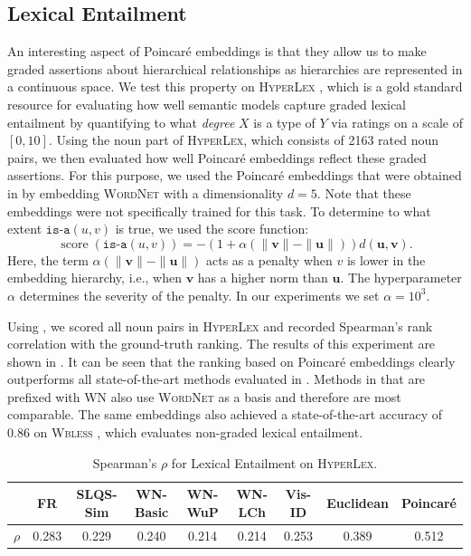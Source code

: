 \documentclass[11pt]{article}
\renewcommand{\vec}[1]{\bm{#1}}
\newcommand{\vu}{\vec{u}}
\newcommand{\vv}{\vec{v}}
\newcommand{\method}[1]{\textsc{#1}\xspace}
\newcommand{\score}{\operatorname{score}}
\begin{document}
\subsection{Lexical Entailment}
\label{sec:org29598e6}
An interesting aspect of Poincaré embeddings is that they allow us to make
graded assertions about hierarchical relationships as hierarchies are
represented in a continuous space. We test this property on \method{HyperLex}
\cite{vulic2016hyperlex}, which is a gold standard resource for evaluating how
well semantic models capture graded lexical entailment by quantifying to what \emph{degree} \(X\) is a type of \(Y\) via
ratings on a scale of \([0,10]\). Using the noun part of \method{HyperLex}, which
consists of 2163 rated noun pairs, we then evaluated how well Poincaré
embeddings reflect these graded assertions. For this purpose, we used the
Poincaré embeddings that were obtained in  by embedding
\method{WordNet} with a dimensionality \(d=5\). Note that these embeddings were
not specifically trained for this task. To determine to what
extent \(\texttt{is-a}(u, v)\) is true, we used the score function:
\begin{equation}
\score(\texttt{is-a}(u,v)) = -(1 + \alpha (\|\vv\| - \|\vu\|)) d(\vu, \vv) \label{eq:hyperlex-score} .
\end{equation}
Here, the term \(\alpha(\|\vv\| - \|\vu\|)\) acts as a penalty
when \(v\) is lower in the embedding hierarchy, i.e., when \(\vv\) has a higher norm
than \(\vu\). The hyperparameter \(\alpha\) determines the severity of the penalty. In
our experiments we set \(\alpha = 10^3\).

Using , we scored all noun pairs in \method{HyperLex}
and recorded Spearman's rank correlation with the ground-truth ranking. The
results of this experiment are shown in .
It can be seen that the ranking based on Poincaré embeddings clearly outperforms
all state-of-the-art methods evaluated in \cite{vulic2016hyperlex}. Methods in
 that are prefixed with WN also use \method{WordNet}
as a basis and therefore are most comparable. The same embeddings also achieved
a state-of-the-art accuracy of \(0.86\) on \method{Wbless}
\cite{weeds2014learning,kiela2015exploiting}, which evaluates non-graded lexical
entailment.

\begin{table}[t]\small
\caption{\label{tab:hyperlex-spearman}
Spearman's \(\rho\) for Lexical Entailment on \method{HyperLex}.}
\centering
\begin{tabular}{lcccccccc}
\toprule
 & \textbf{FR} & \textbf{SLQS-Sim} & \textbf{WN-Basic} & \textbf{WN-WuP} & \textbf{WN-LCh} & \textbf{Vis-ID} & \textbf{Euclidean} & \textbf{Poincaré}\\
\midrule
\(\rho\) & 0.283 & 0.229 & 0.240 & 0.214 & 0.214 & 0.253 & 0.389 & 0.512\\
\bottomrule
\end{tabular}
\end{table}
\end{document}
